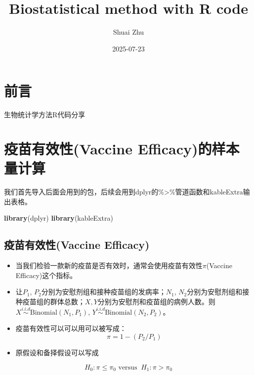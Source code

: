 \documentclass[
]{book}
\title{Biostatistical method with R code}
\author{Shuai Zhu}
\date{2025-07-23}
\newenvironment{Shaded}{\begin{snugshade}}{\end{snugshade}}
\newcommand{\FunctionTok}[1]{\textcolor[rgb]{0.13,0.29,0.53}{\textbf{#1}}}
\newcommand{\NormalTok}[1]{#1}
\begin{document}
\maketitle

{
\setcounter{tocdepth}{1}
\tableofcontents
}
\chapter{前言}\label{ux524dux8a00}

生物统计学方法R代码分享

\chapter{疫苗有效性(Vaccine Efficacy)的样本量计算}\label{ux75abux82d7ux6709ux6548ux6027vaccine-efficacyux7684ux6837ux672cux91cfux8ba1ux7b97}

我们首先导入后面会用到的包，后续会用到dplyr的\%\textgreater\%管道函数和kableExtra输出表格。

\begin{Shaded}
\begin{Highlighting}[]
\FunctionTok{library}\NormalTok{(dplyr)}
\FunctionTok{library}\NormalTok{(kableExtra)}
\end{Highlighting}
\end{Shaded}

\section{疫苗有效性(Vaccine Efficacy)}\label{ux75abux82d7ux6709ux6548ux6027vaccine-efficacy}

\begin{itemize}
\item
  当我们检验一款新的疫苗是否有效时，通常会使用疫苗有效性\(\pi\)(Vaccine Efficacy)这个指标。
\item
  让\(P_1\), \(P_2\)分别为安慰剂组和接种疫苗组的发病率；\(N_1\), \(N_2\)分别为安慰剂组和接种疫苗组的群体总数；\(X, Y\)分别为安慰剂和疫苗组的病例人数。则\(X \overset{i.i.d}{\sim}\text{Binomial}(N_1, P_1)\), \(Y \overset{i.i.d}{\sim}\text{Binomial}(N_2, P_2)\)。
\item
  疫苗有效性可以可以用可以被写成：
  \begin{equation} 
  \pi = 1-(P_2/P_1)
  \label{eq:pi}
  \end{equation}
\item
  原假设和备择假设可以写成
\end{itemize}

\begin{equation} 
  H_0: \pi \leq \pi_0 \text{ versus } \ H_1:\pi>\pi_0   
  \label{eq:hypo1}
\end{equation}
\end{document}
